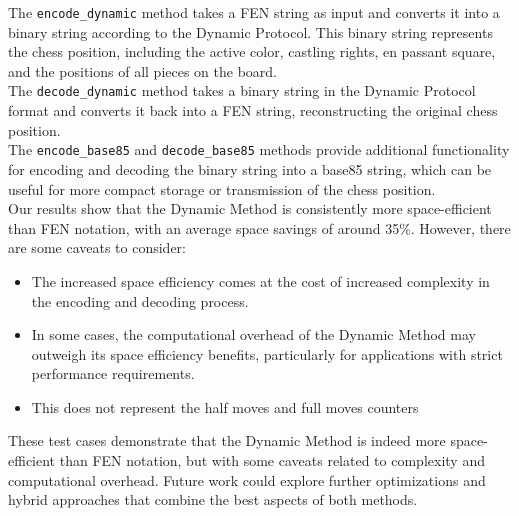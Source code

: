 \documentclass[journal]{journal}
\begin{document}
The \verb|encode_dynamic| method takes a FEN string as input and converts it into a binary string according to the Dynamic Protocol. This binary string represents the chess position, including the active color, castling rights, en passant square, and the positions of all pieces on the board.  \\

The \verb|decode_dynamic| method takes a binary string in the Dynamic Protocol format and converts it back into a FEN string, reconstructing the original chess position.  \\

The \verb|encode_base85| and \verb|decode_base85| methods provide additional functionality for encoding and decoding the binary string into a base85 string, which can be useful for more compact storage or transmission of the chess position. \\

Our results show that the Dynamic Method is consistently more space-efficient than FEN notation, with an average space savings of around 35\%. However, there are some caveats to consider:  

\begin{itemize}  
    \item The increased space efficiency comes at the cost of increased complexity in the encoding and decoding process.
    \item In some cases, the computational overhead of the Dynamic Method may outweigh its space efficiency benefits, particularly for applications with strict performance requirements.  
    \item This does not represent the half moves and full moves counters
\end{itemize}  
   
These test cases demonstrate that the Dynamic Method is indeed more space-efficient than FEN notation, but with some caveats related to complexity and computational overhead. Future work could explore further optimizations and hybrid approaches that combine the best aspects of both methods.

\newpage
\end{document}
